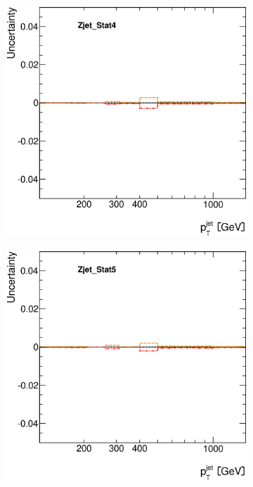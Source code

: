 \documentclass[12pt, twoside]{article}
\numberwithin{equation}{section}
\numberwithin{figure}{section}
\newenvironment{changemargin}[2]{%
\begin{list}{}{%
\setlength{\topsep}{0pt}%
\setlength{\leftmargin}{#1}%
\setlength{\rightmargin}{#2}%
\setlength{\listparindent}{\parindent}%
\setlength{\itemindent}{\parindent}%
\setlength{\parsep}{\parskip}%
}%
\item[]}{\end{list}}
\begin{document}
\begin{figure}[H]
\begin{changemargin}{-1.0cm}{-0.75cm}
\begin{changemargin}{-0.75cm}{-1.0cm}
\begin{subfigure}[b]{0.25\textwidth}
        \end{subfigure}
        \begin{subfigure}[b]{0.25\textwidth}
            \includegraphics[width=\textwidth]{./images/JetSystematics/JetSystematic-51.eps}
        \end{subfigure}
        \begin{subfigure}[b]{0.25\textwidth}
            \includegraphics[width=\textwidth]{./images/JetSystematics/JetSystematic-52.eps}
        \end{subfigure}


\end{changemargin}
\end{changemargin}
\end{figure}
\end{document}

